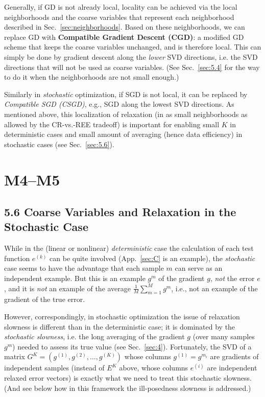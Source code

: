 \documentclass{article} %
\begin{document}
Generally, if GD is not already local, locality can be achieved via the local neighborhoods and the coarse variables that represent each neighborhood described in Sec.~\ref{sec:neighborhoods}. Based on these neighborhoods, we can replace GD with \textbf{Compatible Gradient Descent (CGD)}: a modified GD scheme that keeps the coarse variables unchanged, and is therefore local. This can simply be done by gradient descent along the {\it lower} SVD directions, i.e. the SVD directions that will not be used as coarse variables. (See Sec.~\ref{sec:5.4} for the way to do it when the neighborhoods are not small enough.)

Similarly in {\it stochastic} optimization, if SGD is not local, it can be replaced by {\it Compatible SGD (CSGD)}, e.g., SGD along the lowest SVD directions. As mentioned above, this localization of relaxation (in as small neighborhoods as allowed by the CR-vs.-REE tradeoff) is important for enabling small $K$ in deterministic cases and small amount of averaging (hence data efficiency) in stochastic cases (see Sec.~\ref{sec:5.6}).

\section{M4--M5}
\subsection{5.6 Coarse Variables and Relaxation in the Stochastic Case}
While in the (linear or nonlinear) {\it deterministic} case the calculation of each test function $e^{(k)}$ can be quite involved (App.~\ref{sec:C} is an example), the {\it stochastic} case seems to have the advantage that each sample $m$ can serve as an independent example. But this is an example $g^m$ of the gradient $g$, {\it not} the error $e$, and it is {\it not} an example of the average $\frac{1}{M} \sum_{m=1}^M g^m$, i.e., not an example of the gradient of the true error.

However, correspondingly, in stochastic optimization the issue of relaxation slowness is different than in the deterministic case; it is dominated by the {\it stochastic slowness}, i.e. the long averaging of the gradient $g$ (over many samples $g^m$) needed to assess its true value (see Sec.~\ref{sec:4}). Fortunately, the SVD of a matrix $G^K = (g^{(1)},g^{(2)},\dots,g^{(K)})$ whose columns $g^{(1)}=g^{m_i}$ are gradients of independent samples (instead of $E^K$ above, whose columns $e^{(i)}$ are independent relaxed error vectors) is exactly what we need to treat this stochastic slowness. (And see below how in this framework the ill-posedness slowness is addressed.)
\end{document}
